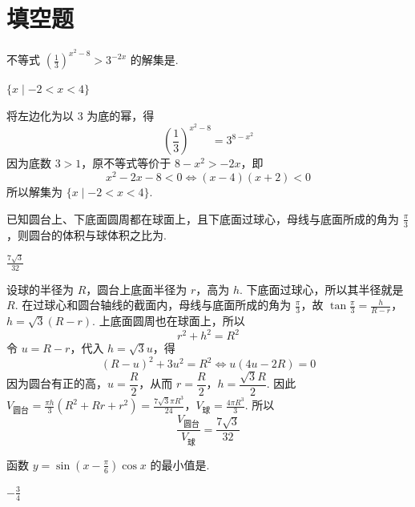 \documentclass[UTF8,a4paper,oneside,11pt]{ctexbook}
\begin{document}
\section{填空题}

\begin{problem}
不等式 \(\left(\frac{1}{3}\right)^{x^{2} - 8} > 3^{-2x}\) 的解集是\fillinblank{}.
\end{problem}

\begin{answer}
\(\{x\mid -2 < x < 4\}\)
\end{answer}

\begin{solution}
将左边化为以 \(3\) 为底的幂，得
\[
\left(\frac13\right)^{x^2-8}=3^{8-x^2}
\]
因为底数 \(3>1\)，原不等式等价于 \(8-x^2>-2x\)，即
\[
x^2-2x-8<0\Longleftrightarrow (x-4)(x+2)<0
\]
所以解集为 \(\{x\mid -2<x<4\}\).
\end{solution}

\begin{problem}
已知圆台上、下底面圆周都在球面上，且下底面过球心，母线与底面所成的角为 \(\frac{\pi}{3}\)，则圆台的体积与球体积之比为\fillinblank{}.
\end{problem}

\begin{answer}
\(\frac{7\sqrt{3}}{32}\)
\end{answer}

\begin{solution}
设球的半径为 \(R\)，圆台上底面半径为 \(r\)，高为 \(h\). 下底面过球心，所以其半径就是 \(R\). 在过球心和圆台轴线的截面内，母线与底面所成的角为 \(\frac{\pi}{3}\)，故
\(\tan\frac{\pi}{3}=\frac{h}{R-r}\)，\(h=\sqrt3(R-r)\).
上底面圆周也在球面上，所以
\[
r^2+h^2=R^2
\]
令 \(u=R-r\)，代入 \(h=\sqrt3u\)，得
\[
(R-u)^2+3u^2=R^2\Longleftrightarrow u(4u-2R)=0
\]
因为圆台有正的高，\(u=\dfrac R2\)，从而 \(r=\dfrac R2\)，\(h=\dfrac{\sqrt3 R}{2}\). 因此
\(V_{\text{圆台}}=\frac{\pi h}{3}\left(R^2+Rr+r^2\right) =\frac{7\sqrt3\pi R^3}{24}\)，\(V_{\text{球}}=\frac{4\pi R^3}{3}\).
所以
\[
\frac{V_{\text{圆台}}}{V_{\text{球}}}
=\frac{7\sqrt3}{32}
\]
\end{solution}

\begin{problem}
函数 \(y = \sin \left(x - \frac{\pi}{6} \right) \cos x \) 的最小值是\fillinblank{}.
\end{problem}

\begin{answer}
\(-\frac{3}{4}\)
\end{answer}
\end{document}
